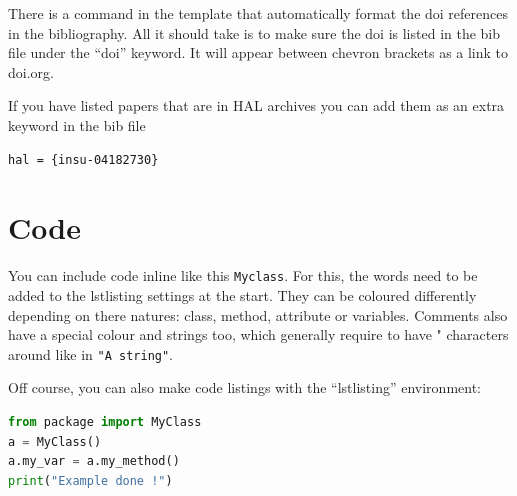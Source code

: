 \documentclass[]{scrartcl}
\begin{document}
There is a command in the template that automatically format the doi references in the bibliography.
All it should take is to make sure the doi is listed in the bib file under the ``doi'' keyword.
It will appear between chevron brackets as a link to doi.org.

If you have listed papers that are in HAL archives you can add them as an extra keyword in the bib file
\begin{lstlisting}
hal = {insu-04182730}
\end{lstlisting}


\section{Code}
\label{s:code}

You can include code inline like this \lstinline!Myclass!. 
For this, the words need to be added to the lstlisting settings at the start.
They can be coloured differently depending on there natures: class, method, attribute or variables.
Comments also have a special colour and strings too, which generally require to have " characters around like in
\lstinline!"A string"!.

Off course, you can also make code listings with the ``lstlisting'' environment:
\begin{lstlisting}[language=Python]
from package import MyClass
a = MyClass()
a.my_var = a.my_method()
print("Example done !")
\end{lstlisting}
\end{document}
